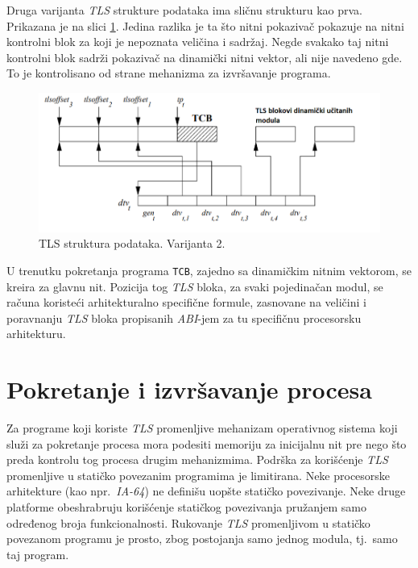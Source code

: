 \documentclass[12pt,oneside]{memoir}
\begin{document}
Druga varijanta \emph{TLS} strukture podataka ima sličnu strukturu kao prva. Prikazana je na slici \ref{fig:tls_model2}. Jedina razlika je ta što nitni pokazivač pokazuje na nitni kontrolni blok za koji je nepoznata veličina i sadržaj. Negde svakako taj nitni kontrolni blok sadrži pokazivač na dinamički nitni vektor, ali nije navedeno gde. To je kontrolisano od strane mehanizma za izvršavanje programa.

\begin{figure}[h!]
	\begin{center}
		\includegraphics[scale=0.6]{slike/TLSmodelV2.png}
	\end{center}
	\caption{TLS struktura podataka. Varijanta 2.}
	\label{fig:tls_model2}
\end{figure}

U trenutku pokretanja programa \texttt{TCB}, zajedno sa dinamičkim nitnim vektorom, se kreira za glavnu nit. Pozicija tog \emph{TLS} bloka, za svaki pojedinačan modul, se računa koristeći arhitekturalno specifične formule, zasnovane na veličini i poravnanju \emph{TLS} bloka propisanih \emph{ABI}-jem za tu specifičnu procesorsku arhitekturu.

\section{Pokretanje i izvršavanje procesa}
\label{sec:pokrTLS}

Za programe koji koriste \emph{TLS} promenljive mehanizam operativnog sistema koji služi za pokretanje procesa mora podesiti memoriju za inicijalnu nit pre nego što preda kontrolu tog procesa drugim mehanizmima. Podrška za korišćenje \emph{TLS} promenljive u statičko povezanim programima je limitirana. Neke procesorske arhitekture (kao npr.~\emph{IA-64}) ne definišu uopšte statičko povezivanje. Neke druge platforme obeshrabruju korišćenje statičkog povezivanja pružanjem samo određenog broja funkcionalnosti. Rukovanje \emph{TLS} promenljivom u statičko povezanom programu je prosto, zbog postojanja samo jednog modula, tj.~samo taj program.
\end{document}

